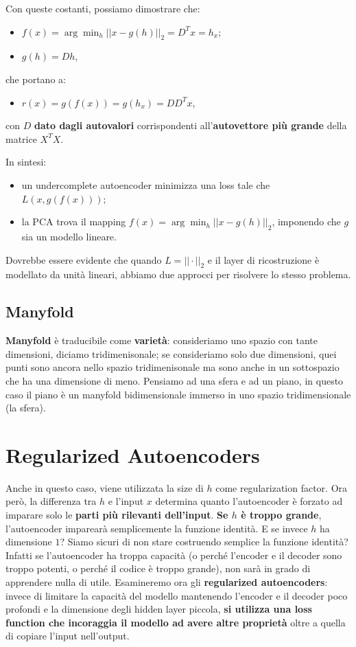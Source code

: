 Con queste costanti, possiamo dimostrare che:
\begin{itemize}
  \item $f(x)=\arg \min_h{||x-g(h)||_2}=D^Tx=h_x$;
  \item $g(h)=Dh$,
\end{itemize}
che portano a:
\begin{itemize}
  \item $r(x)=g(f(x))=g(h_x)=DD^Tx$,
\end{itemize}
con $D$ \textbf{dato dagli autovalori} corrispondenti all'\textbf{autovettore più grande} della matrice 
$X^TX$.
\newpage

In sintesi:
\begin{itemize}
  \item un undercomplete autoencoder minimizza una loss tale che $L(x,g(f(x)))$;
  \item la PCA trova il mapping $f(x)=\arg \min_h{||x-g(h)||_2}$, imponendo che $g$ sia un modello lineare.
\end{itemize}


Dovrebbe essere evidente che quando $L=||\cdot||_2$ e il layer di ricostruzione è modellato da unità
lineari, abbiamo due approcci per risolvere lo stesso problema.


\subsection{Manyfold}
\textbf{Manyfold} è traducibile come \textbf{varietà}: consideriamo uno spazio con tante dimensioni,
diciamo tridimenisonale; se consideriamo solo due dimensioni, quei punti sono ancora nello spazio 
tridimenisonale ma sono anche in un sottospazio che ha una dimensione di meno. Pensiamo ad una sfera e ad 
un piano, in questo caso il piano è un manyfold bidimensionale immerso in uno spazio tridimensionale
(la sfera).
\newpage

\section{Regularized Autoencoders}
Anche in questo caso, viene utilizzata la size di $h$ come regularization factor. Ora però, la differenza tra
$h$ e l'input $x$ determina quanto l'autoencoder è forzato ad imparare solo le \textbf{parti più rilevanti 
dell'input}.
\newline
\textbf{Se $h$ è troppo grande}, l'autoencoder imparearà semplicemente la funzione identità.
\newline
E se invece $h$ ha dimensione $1$? Siamo sicuri di non stare costruendo semplice la funzione identità?
\newline
\newline
Infatti se l'autoencoder ha troppa capacità (o perché l'encoder e il decoder sono troppo potenti,
o perché il codice è troppo grande), non sarà in grado di apprendere nulla di utile.
\newline
Esamineremo ora gli \textbf{regularized autoencoders}: invece di limitare la capacità del modello mantenendo 
l'encoder e il decoder poco profondi e la dimensione degli hidden layer piccola, \textbf{si utilizza una 
loss function che incoraggia il modello ad avere altre proprietà} oltre a quella di copiare l'input nell'output.

